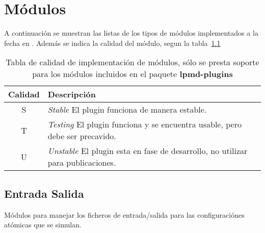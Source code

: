 \appendix

\chapter{M\'odulos}
A continuaci\'on se muestran las listas de los tipos de m\'odulos implementados a la fecha en {\lpmd}. Adem\'as se indica la calidad del m\'odulo, segun la tabla~\ref{tab:modquality}


\begin{table}[h!]\centering
 \begin{tabular}{|c|l|}\hline\hline
 Calidad & Descripci\'on \\\hline\hline
 S & \textit{Stable} El plugin funciona de manera estable. \\
 T & \textit{Testing} El plugin funciona y se encuentra usable, pero debe ser precavido. \\
 U & \textit{Unstable} El plugin esta en fase de desarrollo, no utilizar para publicaciones. \\
\hline
 \end{tabular}
 \label{tab:modquality}
 \caption{Tabla de calidad de implementaci\'on de m\'odulos, s\'olo se presta soporte para los m\'odulos incluidos en el paquete \textbf{lpmd-plugins}}
\end{table}

\section{Entrada Salida}
M\'odulos para manejar los ficheros de entrada/salida para las configuraci\'ones at\'omicas que se simulan.

